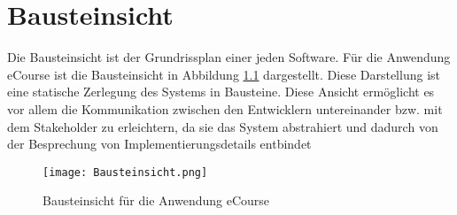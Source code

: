 \chapter{Bausteinsicht}
Die Bausteinsicht ist der Grundrissplan einer jeden Software. Für die Anwendung eCourse ist die Bausteinsicht in Abbildung \ref{fib:Bausteinsicht} dargestellt.
Diese Darstellung ist eine statische Zerlegung des Systems in Bausteine. Diese Ansicht ermöglicht es vor allem die Kommunikation zwischen den Entwicklern untereinander bzw. mit dem Stakeholder zu erleichtern, da sie das System abstrahiert und dadurch von der Besprechung von Implementierungsdetails entbindet

\begin{figure}[H]
\centering
\texttt{[image: Bausteinsicht.png]}
\caption{Bausteinsicht für die Anwendung eCourse}
\label{fib:Bausteinsicht}
\end{figure}
